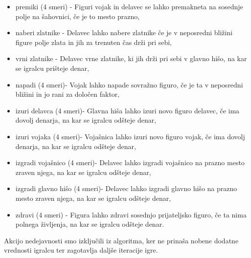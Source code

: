 \documentclass[a4paper, 12pt]{book}
\begin{document}
\begin{itemize}
	\item premiki (4 smeri) - Figuri vojak in delavec se lahko premakneta na sosednje polje na šahovnici, če je to mesto prazno,
	\item naberi zlatnike - Delavec lahko nabere zlatnike če je v neposredni bližini figure polje zlata in jih za trenuten čas drži pri sebi,
	\item vrni zlatnike - Delavec vrne zlatnike, ki jih drži pri sebi v glavno hišo, na kar se igralcu prišteje denar,
	\item napadi (4 smeri)- Vojak lahko napade sovražno figuro, če je ta v neposredni bližini in jo rani za določen faktor,
	\item izuri delavca (4 smeri)- Glavna hiša lahko izuri novo figuro delavec, če ima dovolj denarja, na kar se igralcu odšteje denar,
	\item izuri vojaka (4 smeri)- Vojašnica lahko izuri novo figuro vojak, če ima dovolj denarja, na kar se igralcu odšteje denar,
	\item izgradi vojašnico (4 smeri)- Delavec lahko izgradi vojašnico na prazno mesto zraven njega, na kar se igralcu odšteje denar,
	\item izgradi glavno hišo (4 smeri)- Delavec lahko izgradi glavno hišo na prazno mesto zraven njega, na kar se igralcu odšteje denar,
	\item zdravi (4 smeri) - Figura lahko zdravi sosednjo prijateljsko figuro, če ta nima polnega življenja, na kar se igralcu odšteje denar.
\end{itemize}

Akcijo nedejavnosti smo izključili iz algoritma, ker ne prinaša nobene dodatne vrednosti igralcu ter zagotavlja daljše iteracije igre.
\end{document}
